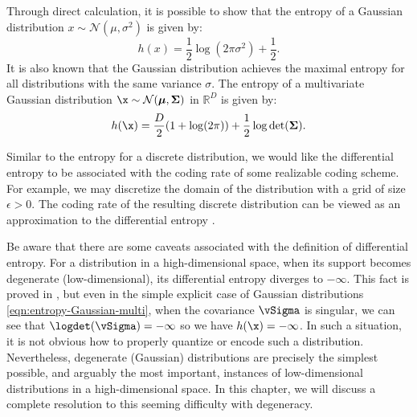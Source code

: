 \documentclass[../../book-main.tex]{subfiles}
\begin{document}
\begin{example}
	Through direct calculation, it is possible to show that the entropy of a Gaussian distribution $x \sim \mathcal{N}(\mu, \sigma^2)$ is given by:
	\begin{equation}
		h(x) = \frac{1}{2}\log (2\pi \sigma^2) + \frac{1}{2}.
		\label{eqn:entropy-Gaussian}
	\end{equation}
	It is also known that the Gaussian distribution achieves the maximal entropy for all distributions with the same variance $\sigma$. The entropy of a multivariate Gaussian distribution $\x \sim \mathcal{N}(\boldsymbol{\mu}, \boldsymbol{\Sigma})$ in $\mathbb{R}^D$ is given by:
	\begin{equation}
		h(\x) = \frac{D}{2}(1 + \log(2\pi)) + \frac{1}{2}\log\det(\boldsymbol{\Sigma}).
		\label{eqn:entropy-Gaussian-multi}
	\end{equation}
\end{example}

Similar to the entropy for a discrete distribution, we would like the differential entropy to be associated with the coding rate of some realizable coding scheme. For example, we may discretize the domain of the distribution with a grid of size $\epsilon >0$. The coding rate of the resulting discrete distribution can be viewed as an approximation to the differential entropy \cite{Cover-Thomas}.


Be aware that there are some caveats associated with the definition of differential entropy. For a distribution in a high-dimensional space, when its support becomes degenerate (low-dimensional), its differential entropy diverges to \(-\infty\). This fact is proved in , but even in the simple explicit case of Gaussian distributions \eqref{eqn:entropy-Gaussian-multi}, when the covariance \(\vSigma\) is singular, we can see that \(\logdet(\vSigma) = -\infty\) so we have $h(\x) = -\infty$. In such a situation, it is not obvious how to properly quantize or encode such a distribution. Nevertheless, degenerate (Gaussian) distributions are precisely the simplest possible, and arguably the most important, instances of low-dimensional distributions in a high-dimensional space. In this chapter, we will discuss a complete resolution to this seeming difficulty with degeneracy.


\end{document}
